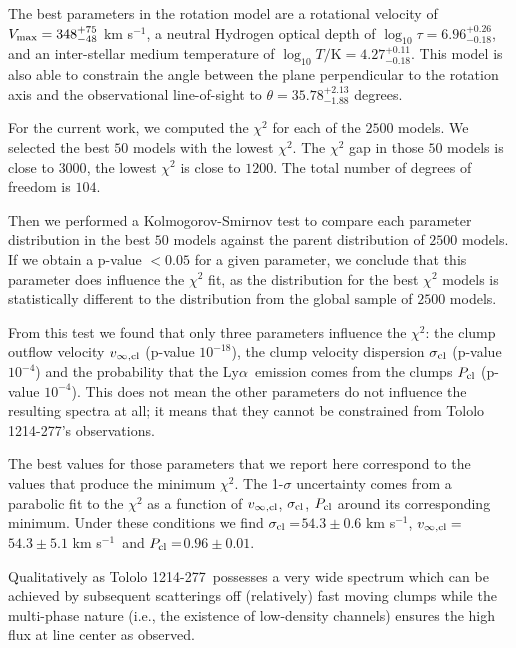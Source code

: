 \documentclass[a4,useAMS,usenatbib,usegraphicx]{mn2e}
\newcommand{\tol}{Tololo 1214-277}
\newcommand{\lya}{Ly$\alpha$}
\newcommand{\kms}{km s$^{-1}$}
\newcommand{\sigmaclump}{$54.3\pm 0.6$ km s$^{-1}$}
\newcommand{\inftyclump}{$54.3\pm 5.1$ km s$^{-1}$}
\newcommand{\probaclump}{$0.96\pm 0.01$}
\begin{document}
The best parameters in the rotation model are a rotational velocity of 
$V_{\rm max}=348^{+75}_{-48}$ \kms, a neutral Hydrogen optical depth of 
$\log_{10}\tau=6.96^{+0.26}_{-0.18}$,  and an inter-stellar medium temperature of $\log_{10} T/\mathrm {K} = 4.27^{+0.11}_{-0.18}$.  
This model is also able to constrain the angle between the plane
perpendicular to the rotation axis and the observational line-of-sight
to $\theta = 35.78^{+2.13}_{-1.88}$ degrees.


 For the current work, we computed the $\chi^2$ for each of the $2500$
models. We selected the best $50$ models with the lowest $\chi^2$. The
$\chi^2$ gap in those $50$ models is close to $3000$, the lowest
$\chi^2$ is close to $1200$. The total number of degrees of freedom is
$104$.    

Then we performed a Kolmogorov-Smirnov test to compare each parameter
distribution in the best $50$ models against the parent distribution
of $2500$ models. 
If we obtain a p-value $<0.05$ for a given parameter, we conclude that
this parameter does influence the $\chi^2$ fit, as the distribution for
the best $\chi^2$ models is statistically different to the
distribution from the global sample of $2500$ models.  

From this test we found that only three parameters influence the
$\chi^2$: the clump outflow velocity $v_{\infty,\rm{cl}}$ (p-value 
$10^{-18}$), the clump velocity dispersion $\sigma_{\rm cl}$ (p-value
$10^{-4}$) and the probability that the \lya\ emission comes from the
clumps $P_{\rm cl}$ (p-value $10^{-4}$). This does not mean the other
parameters do not influence the resulting spectra at all; it means
that they cannot be constrained from \tol's observations. 

The best values for those parameters that we report here correspond to
the values that produce the minimum
$\chi^2$. The 1-$\sigma$ uncertainty comes from a parabolic fit to the
$\chi^2$ as a function of $v_{\infty,\rm{cl}}$, $\sigma_{\rm cl}$,
$P_{\rm cl}$ around its corresponding minimum.
Under these conditions we find $\sigma_{\rm cl}=$\sigmaclump,
$v_{\infty {\rm, cl}}=$\inftyclump\ and $P_{\rm cl}=$\probaclump. 

Qualitatively as \tol\ possesses a very wide spectrum which can be
achieved by subsequent scatterings off (relatively) fast moving clumps
while the multi-phase nature (i.e., the existence of low-density
channels) ensures the high flux at line center as observed.     
\end{document}
